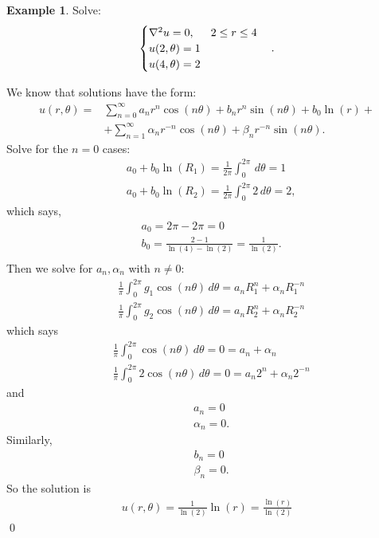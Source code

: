 \documentclass{article}
\theoremstyle{definition}
\newtheorem{exmp}{Example}[section]
\newcommand{\f}[2]{\frac{#1}{#2}}
\begin{document}
\begin{exmp}
	Solve:
	\begin{align*}
	\begin{cases}
	\laplacian u = 0, \hspace{0.5cm} 2\leq r\leq 4\\
	u(2,\theta) = 1\\
	u(4,\theta) = 2
	\end{cases}.
	\end{align*}
	
	We know that solutions have the form:
	\begin{align*}
	u(r,\theta) =& \sum^\infty_{n=0} a_n r^n \cos(n\theta) + b_n r^{n}\sin(n\theta) + b_0\ln(r) +\\
	&+\sum^\infty_{n=1}\alpha_n r^{-n}\cos(n\theta) + \beta_n r^{-n}\sin(n\theta). 
	\end{align*}
	Solve for the $n=0$ cases:
	\begin{align*}
	&a_0 + b_0 \ln(R_1) = \f{1}{2\pi}\int^{2\pi}_0 \,d\theta = 1\\
	&a_0 + b_0 \ln(R_2) = \f{1}{2\pi}\int^{2\pi}_0 2\,d\theta = 2,
	\end{align*}
	which says,
	\begin{align*}
	&a_0 = 2\pi - 2\pi = 0\\
	&b_0 = \frac{2-1}{\ln(4) - \ln(2)} = \f{1}{\ln(2)}.\\
	\end{align*}
	Then we solve for $a_n, \alpha_n$ with $n\neq 0$:
	\begin{align*}
	&\f{1}{\pi}\int^{2\pi}_0 g_1\cos(n\theta)\,d\theta = a_n R_1^n + \alpha_n R_1^{-n}\\
	&\f{1}{\pi}\int^{2\pi}_0 g_2\cos(n\theta)\,d\theta = a_n R_2^n + \alpha_n R_2^{-n}
	\end{align*}
	which says
	\begin{align*}
	&\f{1}{\pi}\int^{2\pi}_0 \cos(n\theta)\,d\theta = 0  = a_n+ \alpha_n\\
	&\f{1}{\pi}\int^{2\pi}_0 2\cos(n\theta)\,d\theta = 0 = a_n 2^n + \alpha_n 2^{-n}
	\end{align*}
	and
	\begin{align*}
	&a_n = 0\\
	&\alpha_n = 0.
	\end{align*}
	Similarly, 
	\begin{align*}
	&b_n = 0\\
	&\beta_n = 0.
	\end{align*}
	So the solution is
	\begin{align*}
	\boxed{u(r,\theta) = \f{1}{\ln(2)}\ln(r) = \f{\ln(r)}{\ln(2)}}
	\end{align*}\qed
\end{exmp}
\end{document}

